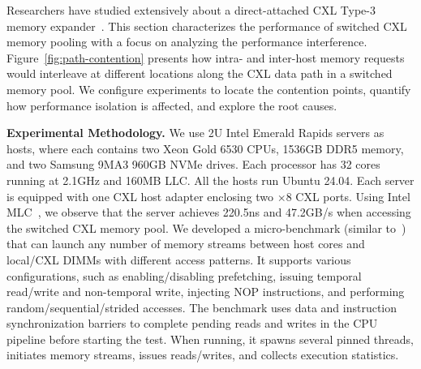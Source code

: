 Researchers have studied extensively about a direct-attached CXL Type-3 memory expander~\cite{cxl-chara-micro23, cxl-against-hotnets23, fcc-hotos23, directcxl-atc22, cxlintro-arxiv23, melody-asplos25, pathfinder-sigcomm25}. This section characterizes the performance of switched CXL memory pooling with a focus on analyzing the performance interference. Figure~\ref{fig:path-contention} presents how intra- and inter-host memory requests would interleave at different locations along the CXL data path in a switched memory pool. We configure experiments to locate the contention points, quantify how performance isolation is affected, and explore the root causes.


\noindent
{\bf Experimental Methodology.} We use 2U Intel Emerald Rapids servers as hosts, where each contains two Xeon Gold 6530 CPUs, 1536GB DDR5 memory, and two Samsung 9MA3 960GB NVMe drives. Each processor has 32 cores running at 2.1GHz and 160MB LLC. All the hosts run Ubuntu 24.04. Each server is equipped with one CXL host adapter enclosing two $\times$8 CXL ports. Using Intel MLC~\cite{intel-mlc}, we observe that the server achieves 220.5ns and 47.2GB/s when accessing the switched CXL memory pool. We developed a micro-benchmark (similar to~\cite{spa-asplos25, pchase, cxl-chara-micro23}) that can launch any number of memory streams between host cores and local/CXL DIMMs with different access patterns. It supports various configurations, such as enabling/disabling prefetching, issuing temporal read/write and non-temporal write, injecting NOP instructions, and performing random/sequential/strided accesses. The benchmark uses data and instruction synchronization barriers to complete pending reads and writes in the CPU pipeline before starting the test. When running, it spawns several pinned threads, initiates memory streams, issues reads/writes, and collects execution statistics.

